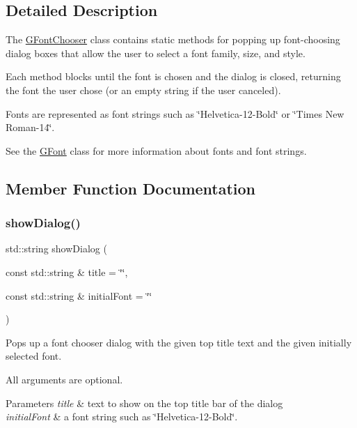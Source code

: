 \subsection{Detailed Description}
The \mbox{\hyperlink{classsgl_1_1GFontChooser}{G\+Font\+Chooser}} class contains static methods for popping up font-\/choosing dialog boxes that allow the user to select a font family, size, and style. 

Each method blocks until the font is chosen and the dialog is closed, returning the font the user chose (or an empty string if the user canceled).

Fonts are represented as font strings such as \char`\"{}\+Helvetica-\/12-\/\+Bold\char`\"{} or \char`\"{}\+Times New Roman-\/14\char`\"{}.

See the \mbox{\hyperlink{classsgl_1_1GFont}{G\+Font}} class for more information about fonts and font strings. 

\subsection{Member Function Documentation}
\mbox{\label{classsgl_1_1GFontChooser_a93eece7081780910ac5878dc6c809f94}} 
\subsubsection{\texorpdfstring{show\+Dialog()}{showDialog()}\hspace{0.1cm}{\footnotesize\ttfamily [1/3]}}
{\footnotesize\ttfamily std\+::string show\+Dialog (\begin{DoxyParamCaption}\item[{const std\+::string \&}]{title = {\ttfamily \char`\"{}\char`\"{}},  }\item[{const std\+::string \&}]{initial\+Font = {\ttfamily \char`\"{}\char`\"{}} }\end{DoxyParamCaption})\hspace{0.3cm}{\ttfamily [static]}}



Pops up a font chooser dialog with the given top title text and the given initially selected font. 

All arguments are optional. 
\begin{DoxyParams}{Parameters}
{\em title} & text to show on the top title bar of the dialog \\
\hline
{\em initial\+Font} & a font string such as \char`\"{}\+Helvetica-\/12-\/\+Bold\char`\"{}. \\
\hline
\end{DoxyParams}
\mbox{\label{classsgl_1_1GFontChooser_a67dee62efca9f2c7fb6d80891a73c32f}} 
